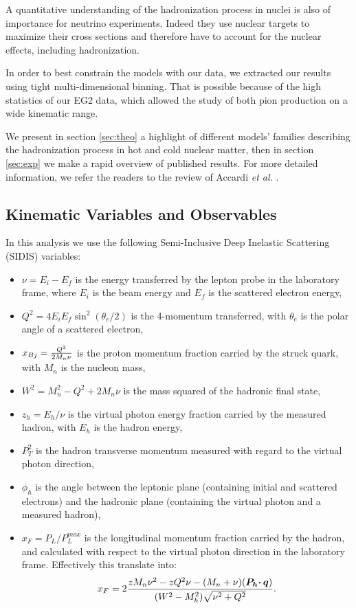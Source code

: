 A quantitative understanding of the hadronization process in nuclei is also of importance for neutrino experiments. Indeed they use nuclear targets to maximize their cross sections and therefore have to account for the nuclear effects, including hadronization. 

In order to best constrain the models with our data, we extracted our results using tight multi-dimensional binning. That is possible because of the high statistics of our EG2 data, which allowed the study of both pion production on a wide kinematic range.

We present in section \ref{sec:theo} a highlight of different models' families describing the hadronization process in hot and cold nuclear matter, then in section \ref{sec:exp} we make a rapid overview of published results. For more detailed information, we refer the readers to the review of Accardi {\it et al.} \cite{Accardi:2009qv}.


\subsection{Kinematic Variables and Observables}

In this analysis we use the following Semi-Inclusive Deep Inelastic Scattering (SIDIS) variables:
\begin{itemize}
 \item $\nu = E_i - E_f$ is the energy transferred by the lepton probe in the laboratory frame, where $E_i$ is the beam energy and $E_f$ is the scattered electron energy,
 \item $Q^2 = 4 E_i E_f \sin ^2(\theta_e / 2)$ is the 4-momentum transferred, with $\theta_e$ is the polar angle of a scattered electron,
 \item $x_{Bj} = {{Q^2} \over {2 M_n \nu}}$ is the proton momentum fraction carried by the struck quark, with $M_n$ is the nucleon mass,
 \item $W^2 = M_n^2 - Q^2 + 2 M_n \nu$ is the mass squared of the hadronic final state,
 \item $z_h = E_h / \nu$ is the virtual photon energy fraction carried by the measured hadron, with $E_h$ is the hadron energy,
 \item $P_T^2$ is the hadron transverse momentum measured with regard to the virtual photon direction,
 \item $\phi_h$ is the angle between the leptonic plane (containing initial and scattered electrons) and the hadronic plane (containing the virtual photon and a measured hadron),
 \item $x_F = P_L/P_L^{max}$ is the longitudinal momentum fraction carried by the hadron, and calculated with respect to the virtual photon direction in the laboratory frame.
 Effectively this translate into: $$ x_F = 2 {z M_n \nu^2 - z Q^2 \nu - (M_n+\nu)(\boldsymbol{P_h \cdotp q}) \over (W^2-M_h^2) \sqrt{\nu^2+Q^2} } .$$
\end{itemize}

